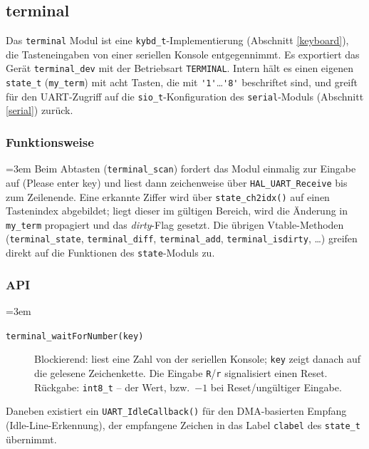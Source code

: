 \subsection{terminal}\label{terminal}
Das \verb|terminal| Modul ist eine \verb|kybd_t|-Implementierung
(Abschnitt \ref{keyboard}), die Tasteneingaben von einer seriellen Konsole
entgegennimmt. Es exportiert das Gerät \verb|terminal_dev| mit der
Betriebsart \verb|TERMINAL|. Intern hält es einen eigenen \verb|state_t|
(\verb|my_term|) mit acht Tasten, die mit \verb|'1'|\dots\verb|'8'|
beschriftet sind, und greift für den UART-Zugriff auf die \verb|sio_t|-Konfiguration
des \verb|serial|-Moduls (Abschnitt \ref{serial}) zurück.

\subsubsection*{Funktionsweise}
{\sloppy\emergencystretch=3em
Beim Abtasten (\verb|terminal_scan|) fordert das Modul einmalig zur Eingabe
auf (\glqq Please enter key\grqq{}) und liest dann zeichenweise über
\verb|HAL_UART_Receive| bis zum Zeilenende. Eine erkannte Ziffer wird über
\verb|state_ch2idx()| auf einen Tastenindex abgebildet; liegt dieser im
gültigen Bereich, wird die Änderung in \verb|my_term| propagiert und das
\emph{dirty}-Flag gesetzt. Die übrigen Vtable-Methoden (\verb|terminal_state|,
\verb|terminal_diff|, \verb|terminal_add|, \verb|terminal_isdirty|, \dots)
greifen direkt auf die Funktionen des \verb|state|-Moduls zu.
\par}

\subsubsection*{API}
{\sloppy\emergencystretch=3em
\begin{description}
\item[\texttt{terminal\_waitForNumber(key)}] Blockierend: liest eine Zahl von
  der seriellen Konsole; \verb|key| zeigt danach auf die gelesene
  Zeichenkette. Die Eingabe \verb|R|/\verb|r| signalisiert einen Reset.
  Rückgabe: \verb|int8_t| -- der Wert, bzw.\ $-1$ bei Reset/ungültiger
  Eingabe.
\end{description}
\par}

\noindent Daneben existiert ein \verb|UART_IdleCallback()| für den
DMA-basierten Empfang (Idle-Line-Erkennung), der empfangene Zeichen in das
Label \verb|clabel| des \verb|state_t| übernimmt.

